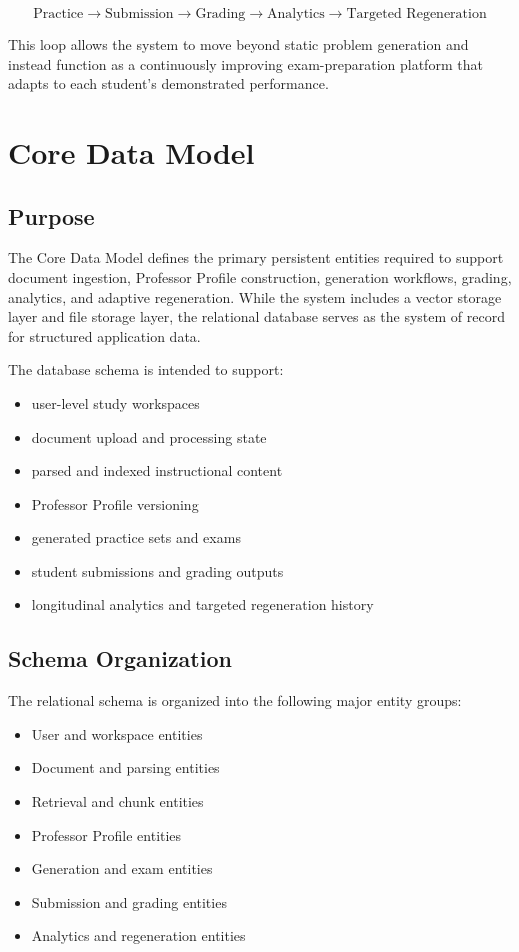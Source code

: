 \documentclass[11pt]{article}
\begin{document}
\[
\text{Practice} \rightarrow \text{Submission} \rightarrow \text{Grading} \rightarrow \text{Analytics} \rightarrow \text{Targeted Regeneration}
\]

This loop allows the system to move beyond static problem generation and instead function as a continuously improving exam-preparation platform that adapts to each student's demonstrated performance.

\section{Core Data Model}

\subsection{Purpose}
The Core Data Model defines the primary persistent entities required to support document ingestion, Professor Profile construction, generation workflows, grading, analytics, and adaptive regeneration. While the system includes a vector storage layer and file storage layer, the relational database serves as the system of record for structured application data.

The database schema is intended to support:
\begin{itemize}
\item user-level study workspaces
\item document upload and processing state
\item parsed and indexed instructional content
\item Professor Profile versioning
\item generated practice sets and exams
\item student submissions and grading outputs
\item longitudinal analytics and targeted regeneration history
\end{itemize}

\subsection{Schema Organization}
The relational schema is organized into the following major entity groups:
\begin{itemize}
\item User and workspace entities
\item Document and parsing entities
\item Retrieval and chunk entities
\item Professor Profile entities
\item Generation and exam entities
\item Submission and grading entities
\item Analytics and regeneration entities
\end{itemize}
\end{document}

